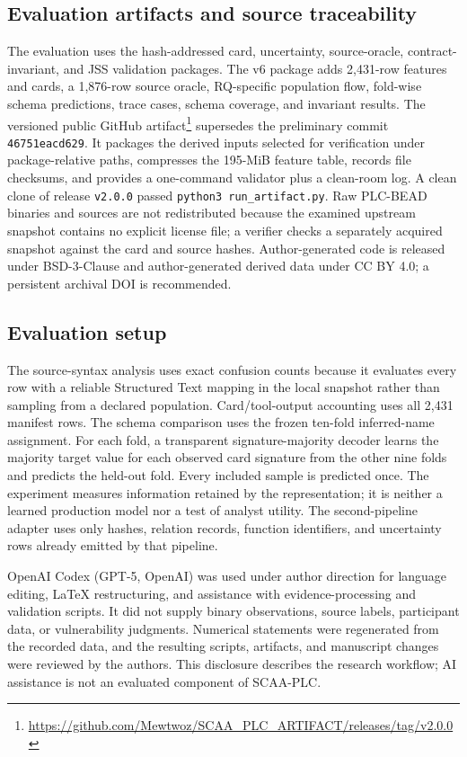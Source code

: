 \documentclass[manuscript,screen,review]{acmart}
\begin{document}
\subsection{Evaluation artifacts and source traceability}

The evaluation uses the hash-addressed card, uncertainty, source-oracle, contract-invariant, and JSS validation packages. The v6 package adds 2{,}431-row features and cards, a 1{,}876-row source oracle, RQ-specific population flow, fold-wise schema predictions, trace cases, schema coverage, and invariant results. The versioned public GitHub artifact\footnote{\url{https://github.com/Mewtwoz/SCAA_PLC_ARTIFACT/releases/tag/v2.0.0}} supersedes the preliminary commit \texttt{46751eacd629}. It packages the derived inputs selected for verification under package-relative paths, compresses the 195-MiB feature table, records file checksums, and provides a one-command validator plus a clean-room log. A clean clone of release \texttt{v2.0.0} passed \texttt{python3 run\_artifact.py}. Raw PLC-BEAD binaries and sources are not redistributed because the examined upstream snapshot contains no explicit license file; a verifier checks a separately acquired snapshot against the card and source hashes. Author-generated code is released under BSD-3-Clause and author-generated derived data under CC BY 4.0; a persistent archival DOI is recommended.

\subsection{Evaluation setup}

The source-syntax analysis uses exact confusion counts because it evaluates every row with a reliable Structured Text mapping in the local snapshot rather than sampling from a declared population. Card/tool-output accounting uses all 2{,}431 manifest rows. The schema comparison uses the frozen ten-fold inferred-name assignment. For each fold, a transparent signature-majority decoder learns the majority target value for each observed card signature from the other nine folds and predicts the held-out fold. Every included sample is predicted once. The experiment measures information retained by the representation; it is neither a learned production model nor a test of analyst utility. The second-pipeline adapter uses only hashes, relation records, function identifiers, and uncertainty rows already emitted by that pipeline.

OpenAI Codex (GPT-5, OpenAI) was used under author direction for language editing, LaTeX restructuring, and assistance with evidence-processing and validation scripts. It did not supply binary observations, source labels, participant data, or vulnerability judgments. Numerical statements were regenerated from the recorded data, and the resulting scripts, artifacts, and manuscript changes were reviewed by the authors. This disclosure describes the research workflow; AI assistance is not an evaluated component of SCAA-PLC.
\end{document}
